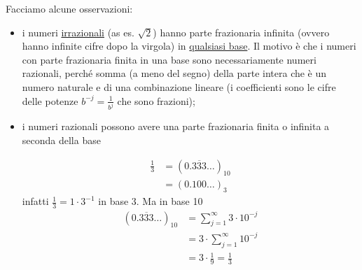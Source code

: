 Facciamo alcune osservazioni:
\begin{itemize}
    \item i numeri \uline{irrazionali} (as es. $\sqrt{2}$) hanno parte frazionaria infinita (ovvero hanno infinite cifre dopo la virgola) in \uline{qualsiasi base}. Il motivo è che i numeri con parte frazionaria finita in una base sono necessariamente numeri razionali, perché somma (a meno del segno) della parte intera che è un numero naturale e di una combinazione lineare (i coefficienti sono le cifre delle potenze $b^{-j} = \frac{1}{b^j}$ che sono frazioni);
    \item i numeri razionali possono avere una parte frazionaria finita o infinita a seconda della base
    \begin{esempio} \end{esempio}
    \[ \begin{split}
        \frac{1}{3} & = (0.\overline{333} \dotsc)_{10} \\
        & = (0.100 \dotsc)_{3}
    \end{split} \]
    infatti $\frac{1}{3} = 1 \cdot 3^{-1}$ in base 3. Ma in base 10
    \[ \begin{split}
        (0.\overline{333} \dotsc)_{10} & = \sum_{j=1}^{\infty} 3 \cdot 10^{-j} \\
        & = 3 \cdot \sum_{j=1}^{\infty} 10^{-j} \\
        & = 3 \cdot \frac{1}{9} = \frac{1}{3} \\
        \end{split} 
        \]
\end{itemize}

